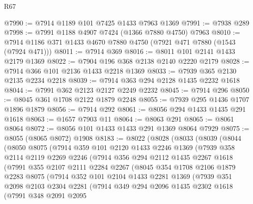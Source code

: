 \begin{lexlean}{R67}
\begin{coremodule}
@7990 := @7914 @1189 @101 @7425 @1433 @7963 @1369
@7991 := @7938 @289
@7998 := @7991 @1188 @4907 @7424 (@1366 @7880 @4750) @7963
@8010 := @7914 @1186 @371 @1433 @4670 @7880 @4750 (@7921 @471 @7880 (@1543 (@7924 @471)))
@8011 := @7914 @369
@8016 := @8011 @101 @2141 @1433 @2179 @1369
@8022 := @7904 @196 @368 @2138 @2140 @2220 @2179
@8028 := @7914 @366 @101 @2136 @1433 @2218 @1369
@8033 := @7939 @365 @2130 @2135 @2234 @2218
@8039 := @7914 @363 @294 @2128 @1435 @2232 @1618
@8044 := @7991 @362 @2123 @2127 @2249 @2232
@8045 := @7914 @296
@8050 := @8045 @361 @1708 @2122 @1879 @2248
@8055 := @7939 @295 @1436 @1707 @1896 @1879
@8056 := @7914 @292
@8061 := @8056 @294 @1433 @1435 @291 @1618
@8063 := @1657 @7903 @11
@8064 := @8063 @291
@8065 := @8061 @8064
@8072 := @8056 @101 @1433 @1433 @291 @1369 @8064 @7929
@8075 := @8055 (@8065 @8072) @1908
@8183 := @8022
    (@8028
      (@8033
        (@8039
          (@8044
            (@8050
              @8075
              (@7914
                @359
                @101
                @2120
                @1433
                @2246
                @1369
                (@7939
                  @358
                  @2114
                  @2119
                  @2269
                  @2246
                  (@7914
                    @356
                    @294
                    @2112
                    @1435
                    @2267
                    @1618
                    (@7991
                      @355
                      @2107
                      @2111
                      @2284
                      @2267
                      (@8045
                        @354
                        @1708
                        @2106
                        @1879
                        @2283
                        @8075
                        (@7914
                          @352
                          @101
                          @2104
                          @1433
                          @2281
                          @1369
                          (@7939
                            @351
                            @2098
                            @2103
                            @2304
                            @2281
                            (@7914
                              @349
                              @294
                              @2096
                              @1435
                              @2302
                              @1618
                              (@7991
                                @348
                                @2091
                                @2095

\end{coremodule}
\end{lexlean}
